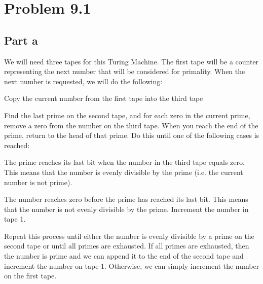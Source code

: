 \documentclass{article}%
\begin{document}
\section*{Problem 9.1}

\subsection*{Part a}

We will need three tapes for this Turing Machine. The first tape will be a counter representing the next number that will be considered
for primality. When the next number is requested, we will do the following:
\begin{enumerate}
    \begin{item}
        Copy the current number from the first tape into the third tape
    \end{item}

    \begin{item}
        Find the last prime on the second tape, and for each zero in the current prime, remove a zero from the number on the third tape. When you reach the
        end of the prime, return to the head of that prime. Do this until one of the following cases is reached:
        \begin{enumerate}
            \begin{item}
                The prime reaches its last bit when the number in the third tape equals zero. This means that the number is evenly divisible by the
                prime (i.e. the current number is not prime).
            \end{item}

            \begin{item}
                The number reaches zero before the prime has reached its last bit. This means that the number is not evenly divisible by the prime. Increment
                the number in tape 1.
            \end{item}
        \end{enumerate}
    \end{item}

    \begin{item}
        Repeat this process until either the number is evenly divisible by a prime on the second tape or until all primes are exhausted. If all primes are
        exhausted, then the number is prime and we can append it to the end of the second tape and increment the number on tape 1. Otherwise, we can simply
        increment the number on the first tape.
    \end{item}
\end{enumerate}
\end{document}
